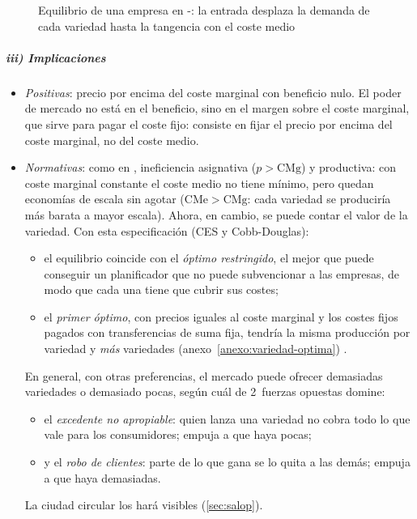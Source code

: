 \documentclass[11pt]{article}
\begin{document}
\begin{figure}[H]
\centering
\caption{Equilibrio de una empresa en -: la entrada desplaza la demanda de cada variedad hasta la tangencia con el coste medio}\label{fig:dixit-stiglitz}
\end{figure}

\subparagraph{iii) Implicaciones}

\begin{itemize}
\item \emph{Positivas}: precio por encima del coste marginal con beneficio nulo. El poder de mercado no está en el beneficio, sino en el margen sobre el coste marginal, que sirve para pagar el coste fijo: consiste en fijar el precio por encima del coste marginal, no del coste medio.
\item \emph{Normativas}: como en , ineficiencia asignativa ($p>\mathrm{CMg}$) y productiva: con coste marginal constante el coste medio no tiene mínimo, pero quedan economías de escala sin agotar ($\mathrm{CMe}>\mathrm{CMg}$: cada variedad se produciría más barata a mayor escala). Ahora, en cambio, se puede contar el valor de la variedad. Con esta especificación (CES y Cobb-Douglas):
  \begin{itemize}
  \item el equilibrio coincide con el \emph{óptimo restringido}, el mejor que puede conseguir un planificador que no puede subvencionar a las empresas, de modo que cada una tiene que cubrir sus costes\nocite{DixitStiglitz1977Monopolistic};
  \item el \emph{primer óptimo}, con precios iguales al coste marginal y los costes fijos pagados con transferencias de suma fija, tendría la misma producción por variedad y \emph{más} variedades (anexo~\ref{anexo:variedad-optima}) .
  \end{itemize}
  En general, con otras preferencias, el mercado puede ofrecer demasiadas variedades o demasiado pocas, según cuál de 2~fuerzas opuestas domine\nocite{Spence1976Product,MankiwWhinston1986Free}:
  \begin{itemize}
  \item el \emph{excedente no apropiable}: quien lanza una variedad no cobra todo lo que vale para los consumidores; empuja a que haya pocas;
  \item y el \emph{robo de clientes}: parte de lo que gana se lo quita a las demás; empuja a que haya demasiadas.
  \end{itemize}
  La ciudad circular los hará visibles (\ref{sec:salop}).
\end{itemize}
\end{document}
